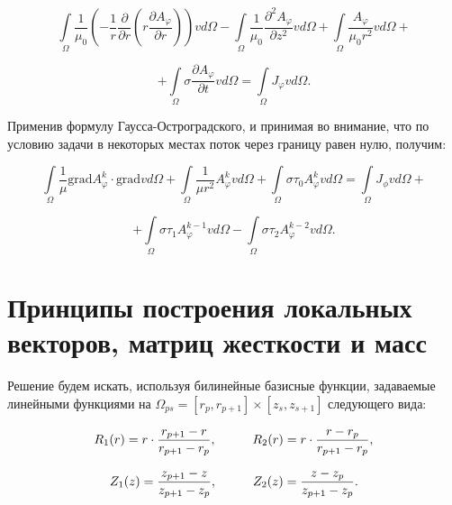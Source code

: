 \begin{equation*}
	\int \limits_{\Omega} \frac{1}{\mu_0} \left( -\frac{1}{r} \frac{\partial}{\partial r} \left( r \frac{\partial A_{\varphi}}{\partial r} \right) \right) v d \Omega - \int \limits_{\Omega} \frac{1}{\mu_0} \frac{\partial^2 A_{\varphi}}{\partial z^2} v d\Omega + \int \limits_{\Omega} \frac{A_{\varphi}}{\mu_0 r^2} v d \Omega + 
\end{equation*}

\begin{equation} \label{eq_1_3}
	+ \int \limits_{\Omega} \sigma \frac{\partial A_{\varphi}}{\partial t} v d \Omega = \int \limits_{\Omega} J_{\varphi} v d \Omega.
\end{equation}

Применив формулу Гаусса-Остроградского, и принимая во внимание, что по условию задачи в некоторых местах поток через границу равен нулю, получим:

\begin{equation*}
	\int \limits_{\Omega} \frac{1}{\mu} \text{grad} A_{\varphi}^{k} \cdot \text{grad}v d \Omega + \int \limits_{\Omega} \frac{1}{\mu r^2} A_{\varphi}^{k} v d \Omega + \int \limits_{\Omega} \sigma \tau_0 A_{\varphi}^{k} v d \Omega =\int \limits_{\Omega} J_{\phi} v d \Omega +	
\end{equation*}

\begin{equation} \label{eq_1_4}
	+ \int \limits_{\Omega} \sigma  \tau_1 A_{\varphi}^{k-1} v d \Omega - \int \limits_{\Omega} \sigma  \tau_2 A_{\varphi}^{k - 2} v d \Omega.
\end{equation}

\section{Принципы построения локальных векторов, матриц жесткости и масс}

Решение будем искать, используя билинейные базисные функции, задаваемые линейными функциями на $\Omega_{ps} = [r_p, r_{p+1}] \times [z_s, z_{s+1}]$ следующего вида:

\begin{equation} \label{eq_1_5}
	R_1(r) = r \cdot \frac{r_{p + 1} - r}{r_{p + 1} - r_p}, \hspace{10mm} R_2(r) = r \cdot \frac{r - r_p}{r_{p + 1} - r_p},
\end{equation}

\begin{equation} \label{eq_1_6}
	Z_1(z) = \frac{z_{p + 1} - z}{z_{p + 1} - z_p}, \hspace{10mm} Z_2(z) = \frac{z - z_p}{z_{p + 1} - z_p}.
\end{equation}

